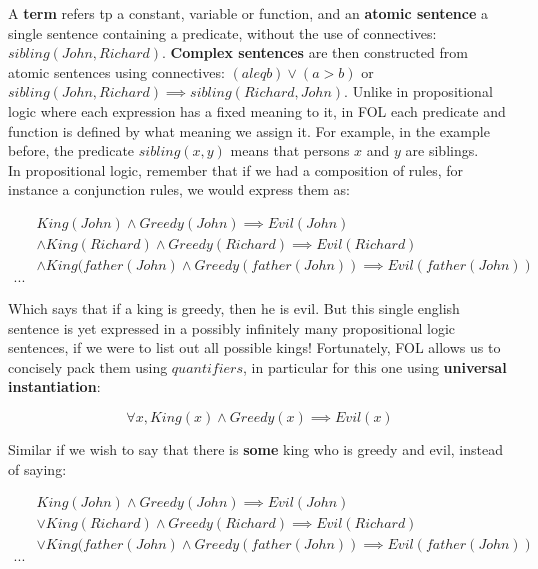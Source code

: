 \documentclass[12pt]{article}
\begin{document}
A \textbf{term} refers tp a constant, variable or function, and an\textbf{ atomic sentence} a single sentence containing a predicate, without the use of connectives: $sibling(John, Richard)$. \textbf{Complex sentences} are then constructed from atomic sentences using connectives: $(a leq b) \lor (a > b)$ or $sibling(John, Richard) \implies sibling(Richard, John)$. Unlike in propositional logic where each expression has a fixed meaning to it, in FOL each predicate and function is defined by what meaning we assign it. For example, in the example before, the predicate $sibling(x, y)$ means that persons $x$ and $y$ are siblings.\\

In propositional logic, remember that if we had a composition of rules, for instance a conjunction rules, we would express them as:

\begin{equation*}
\begin{aligned}
&King(John) \land Greedy(John) \implies Evil(John)\\
&\land King(Richard) \land Greedy(Richard) \implies Evil(Richard)\\
&\land King(father(John) \land Greedy(father(John)) \implies Evil(father(John))\\
...
\end{aligned}
\end{equation*}

Which says that if a king is greedy, then he is evil. But this single english sentence is yet expressed in a possibly infinitely many propositional logic sentences, if we were to list out all possible kings! Fortunately, FOL allows us to concisely pack them using $quantifiers$, in particular for this one using \textbf{universal instantiation}:

\begin{equation*}
\forall x, King(x) \land Greedy(x) \implies Evil(x)
\end{equation*}

Similar if we wish to say that there is \textbf{some} king who is greedy and evil, instead of saying:

\begin{equation*}
\begin{aligned}
&King(John) \land Greedy(John) \implies Evil(John)\\
&\lor King(Richard) \land Greedy(Richard) \implies Evil(Richard)\\
&\lor King(father(John) \land Greedy(father(John)) \implies Evil(father(John))\\
...
\end{aligned}
\end{equation*}
\end{document}
